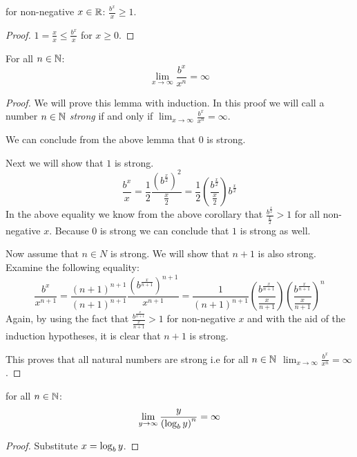 \begin{corollary}
	for non-negative $x \in \mathbb{R}$: $\frac{b^{x}}{x} \ge 1$.
\end{corollary}

\begin{proof}
	$1 = \frac{x}{x} \le \frac{b^{x}}{x}$ for $x \ge 0$.
\end{proof}

\begin{proposition}
	For all $n \in \mathbb{N}$: 
	\[
		\lim_{x \rightarrow \infty} \frac{b^{x}}{x^{n}} = \infty
	\]
\end{proposition}

\begin{proof}
	We will prove this lemma with induction. In this proof we will call a number
	$n \in \mathbb{N}$ \emph{strong} if and only if
	$\lim_{x \rightarrow \infty} \frac{b^{x}}{x^{n}} = \infty$.
	
	We can conclude from the above lemma that $0$ is strong.
	
	Next we will show that $1$ is strong.
	\[
		\frac{b^{x}}{x} =%
		\frac{1}{2}\frac{\left(b^{\frac{x}{2}}\right)^2}{\frac{x}{2}} =%
		\frac{1}{2}\left(\frac{b^{\frac{x}{2}}}{\frac{x}{2}}\right)b^{\frac{x}{2}}
	\]
	In the above equality we know from the above corollary that 
	$\frac{b^{\frac{x}{2}}}{\frac{x}{2}} > 1$ for all non-negative $x$.
	Because $0$ is strong we can conclude that $1$ is strong as well.
	
	Now assume that $n \in N$ is strong. We will show that $n+1$ is also strong.
	Examine the following equality:
	\[
		\frac{b^{x}}{x^{n+1}} =%
		\frac{(n+1)^{n+1}}{(n+1)^{n+1}}%
		\frac{\left(b^{\frac{x}{n+1}}\right)^{n+1}}{x^{n+1}} =%
		\frac{1}{(n+1)^{n+1}}%
		\left(\frac{b^{\frac{x}{n+1}}}{\frac{x}{n+1}}\right)%
		\left(\frac{b^{\frac{x}{n+1}}}{\frac{x}{n+1}}\right)^{n}%
	\]
	Again, by using the fact that $\frac{b^{\frac{x}{n+1}}}{\frac{x}{n+1}} > 1$
	for non-negative $x$ and with the aid of the induction hypotheses, it is 
	clear that $n+1$ is strong.
	
	This proves that all natural numbers are strong i.e for all $n \in \mathbb{N}$
	$\lim_{x \rightarrow \infty} \frac{b^{x}}{x^{n}} = \infty$.
\end{proof}

\begin{corollary}
	for all $n \in \mathbb{N}$:
	\[
		\lim_{y \rightarrow \infty} \frac{{y}}{\left(\log_{b}{y}\right)^{n}} = \infty
	\]
\end{corollary}

\begin{proof}
	Substitute $x = \log_{b}{y}$.
\end{proof}
